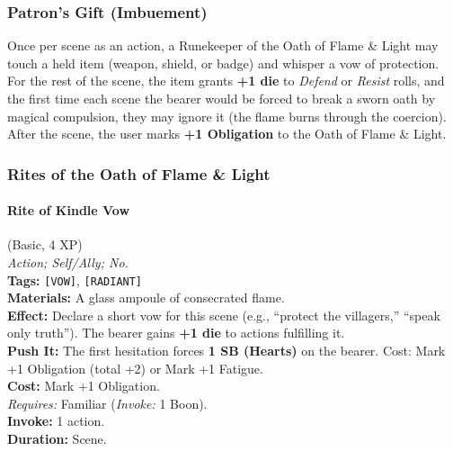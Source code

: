 \subsubsection*{Patron's Gift (Imbuement)}

Once per scene as an action, a Runekeeper of the Oath of Flame \& Light may touch a held item (weapon, shield, or badge) and whisper a vow of protection. For the rest of the scene, the item grants \textbf{+1 die} to \textit{Defend} or \textit{Resist} rolls, and the first time each scene the bearer would be forced to break a sworn oath by magical compulsion, they may ignore it (the flame burns through the coercion). After the scene, the user marks \textbf{+1 Obligation} to the Oath of Flame \& Light.

\subsubsection*{Rites of the Oath of Flame \& Light}

\paragraph{Rite of Kindle Vow} (Basic, 4 XP) \hfill \\
\emph{Action; Self/Ally; No.} \\
\textbf{Tags:} \texttt{[VOW]}, \texttt{[RADIANT]} \\
\textbf{Materials:} A glass ampoule of consecrated flame. \\
\textbf{Effect:} Declare a short vow for this scene (e.g., ``protect the villagers,'' ``speak only truth''). The bearer gains \textbf{+1 die} to actions fulfilling it. \\
\textbf{Push It:} The first hesitation forces \textbf{1 SB (Hearts)} on the bearer. Cost: Mark +1 Obligation (total +2) or Mark +1 Fatigue. \\
\textbf{Cost:} Mark +1 Obligation. \\
\textit{Requires:} Familiar (\textit{Invoke:} 1 Boon). \\
\textbf{Invoke:} 1 action. \\
\textbf{Duration:} Scene.

